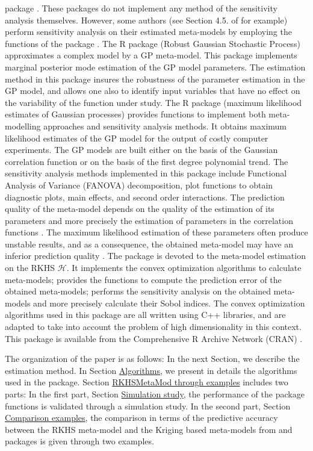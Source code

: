 package  \citep{JSSv042i11}. These packages do not implement any method of the sensitivity analysis themselves. However, some authors (see Section 4.5. of \citet{JSSv051i01} for example) perform sensitivity analysis on their estimated meta-models by employing the functions of the package . 
The R package  (Robust Gaussian Stochastic Process) \citep{Gu_2019} approximates a complex model by a GP meta-model. This package implements marginal posterior mode estimation of the GP model parameters. The estimation method in this package insures the robustness of the parameter estimation in the GP model, and allows one also to identify input variables that have no effect on the variability of the function under study. 
The R package  (maximum likelihood estimates of Gaussian processes) \citep{mlegp} provides functions to implement both meta-modelling approaches and sensitivity analysis methods. It obtains maximum likelihood estimates of the GP model for the output of costly computer experiments. 
The GP models are built either on the basis of the Gaussian correlation function or on the basis of the first degree polynomial trend.
The sensitivity analysis methods implemented in this package include Functional Analysis of Variance (FANOVA) decomposition, plot functions to obtain diagnostic plots, main effects, and second order interactions. 
The prediction quality of the meta-model depends on the quality of the estimation of its parameters and more precisely the estimation of parameters in the correlation functions \citep{Kennedy00bayesiancalibration}. 
The maximum likelihood estimation of these parameters often produce unstable results, and as a consequence, the obtained meta-model may have an inferior prediction quality \citep{10.1214/17-AOS1648,10.1214/18-BA1133}. 
The  package is devoted to the meta-model estimation on the RKHS $\mathcal{H}$.
It implements the convex optimization algorithms to calculate meta-models; provides the functions to compute the prediction error of the obtained meta-models; performs the sensitivity analysis on the obtained meta-models and more precisely calculate their Sobol indices. 
The convex optimization algorithms used in this package are all written using C++ libraries, and are adapted to take into account the problem of high dimensionality in this context. 
This package is available from the Comprehensive R Archive Network (CRAN) \citep{rkhsmeamodpackage}.

The organization of the paper is as follows: In the next Section, we describe the estimation method. In Section \hyperref[sec:Optalgo]{Algorithms}, we present in details the algorithms used in the  package. 
Section \hyperref[sec:examples]{RKHSMetaMod through examples} includes two parts: In the first part, Section \hyperref[subsec:simulstdy]{Simulation study}, the performance of the  package functions is validated through a simulation study. In the second part, Section \hyperref[subsec:comprexpl]{Comparison examples}, the comparison in terms of the predictive accuracy between the RKHS meta-model and the Kriging based meta-models from  \citep{Gu_2019} and  \citep{JSSv051i01} packages is given through two examples.
